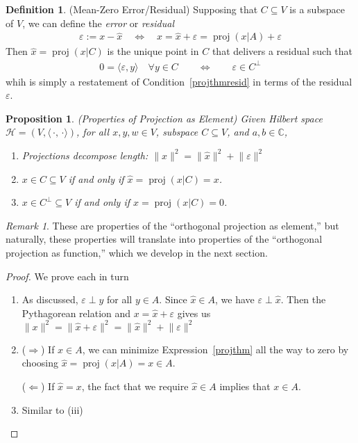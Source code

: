 \documentclass[12pt]{book}
\numberwithin{equation}{section} %
\theoremstyle{plain}
\newtheorem{prop}[thm]{Proposition}
\theoremstyle{definition}
\newtheorem{defn}[thm]{Definition}
\theoremstyle{remark}
\newtheorem*{rmk}{Remark}
\newcommand{\proj}{\operatorname{proj}}
\newcommand{\calH}{\mathcal{H}}
\newcommand{\C}{\mathbb{C}}
\begin{document}
\begin{defn}(Mean-Zero Error/Residual)
Supposing that $C\subseteq V$ is a subspace of $V$,
we can define the \emph{error} or \emph{residual}
\begin{align*}
  \varepsilon:=x-\hat{x}
  \quad\iff\quad
  x=\hat{x}+\varepsilon=\proj(x|A)+\varepsilon
\end{align*}
Then $\hat{x}=\proj(x|C)$ is the unique point in $C$ that delivers a
residual such that
\begin{align*}
  0 = \langle \varepsilon,y\rangle
  \quad\forall y \in C
  \qquad\iff\qquad
  \varepsilon\in C^\perp
\end{align*}
whih is simply a restatement of Condition~\ref{projthmresid} in terms
of the residual $\varepsilon$.
\end{defn}

\begin{prop}\emph{(Properties of Projection as Element)}
Given Hilbert space $\calH=(V,\langle\,\cdot,\,\cdot\rangle)$,
for all $x,y,w\in V$, subspace $C\subseteq V$, and $a,b\in\C$,
\begin{enumerate}[label=\emph{(\roman*)}]
  \item \emph{Projections decompose length}:
    $\lVert x\rVert^2
    = \lVert\hat{x}\rVert^2 + \lVert \varepsilon\rVert^2$
  \item $x\in C\subseteq V$ if and only if $\hat{x}=\proj(x|C)=x$.
  \item $x\in C^\perp \subseteq V$ if and only if
    $\hat{x}=\proj(x|C)=0$.
\end{enumerate}
\end{prop}
\begin{rmk}
These are properties of the ``orthogonal projection as element,'' but
naturally, these properties will translate into properties of the
``orthogonal projection as function,''
which we develop in the next section.
\end{rmk}
\begin{proof}
We prove each in turn
\begin{enumerate}[label=(\roman*)]
  \item As discussed, $\varepsilon\perp y$ for all $y\in A$.
    Since $\hat{x}\in A$, we have $\varepsilon\perp \hat{x}$.
    Then the Pythagorean relation and $x=\hat{x}+\varepsilon$ gives us
    $\lVert x\rVert^2 = \lVert \hat{x}+\varepsilon\rVert^2 =\lVert
    \hat{x}\rVert^2 + \lVert \varepsilon\rVert^2$
  \item
    ($\Rightarrow$)
    If $x\in A$, we can minimize Expression~\ref{projthm}
    all the way to zero by choosing $\hat{x}=\proj(x|A)=x\in A$.

    ($\Leftarrow$) If $\hat{x}=x$, the fact that we require
    $\hat{x}\in A$ implies that $x\in A$.
  \item Similar to (iii)
\end{enumerate}
\end{proof}
\end{document}
